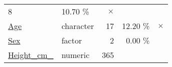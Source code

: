 \documentclass[]{report}
\begin{document}
\begin{longtable}[]{@{}llrrc@{}}
\begin{minipage}[t]{0.17\columnwidth}
8\strut
\end{minipage} & \begin{minipage}[t]{0.22\columnwidth}\raggedleft\strut
10.70 \%\strut
\end{minipage} & \begin{minipage}[t]{0.14\columnwidth}\centering\strut
\(\times\)\strut
\end{minipage}\tabularnewline
\begin{minipage}[t]{0.16\columnwidth}\raggedright\strut
\protect\hyperlink{age}{Age}\strut
\end{minipage} & \begin{minipage}[t]{0.16\columnwidth}\raggedright\strut
character\strut
\end{minipage} & \begin{minipage}[t]{0.17\columnwidth}\raggedleft\strut
17\strut
\end{minipage} & \begin{minipage}[t]{0.22\columnwidth}\raggedleft\strut
12.20 \%\strut
\end{minipage} & \begin{minipage}[t]{0.14\columnwidth}\centering\strut
\(\times\)\strut
\end{minipage}\tabularnewline
\begin{minipage}[t]{0.16\columnwidth}\raggedright\strut
\protect\hyperlink{sex}{Sex}\strut
\end{minipage} & \begin{minipage}[t]{0.16\columnwidth}\raggedright\strut
factor\strut
\end{minipage} & \begin{minipage}[t]{0.17\columnwidth}\raggedleft\strut
2\strut
\end{minipage} & \begin{minipage}[t]{0.22\columnwidth}\raggedleft\strut
0.00 \%\strut
\end{minipage} & \begin{minipage}[t]{0.14\columnwidth}\centering\strut
\strut
\end{minipage}\tabularnewline
\begin{minipage}[t]{0.16\columnwidth}\raggedright\strut
\protect\hyperlink{height_cm_}{Height\_cm\_}\strut
\end{minipage} & \begin{minipage}[t]{0.16\columnwidth}\raggedright\strut
numeric\strut
\end{minipage} & \begin{minipage}[t]{0.17\columnwidth}\raggedleft\strut
365\strut

\end{minipage}
\end{longtable}
\end{document}
